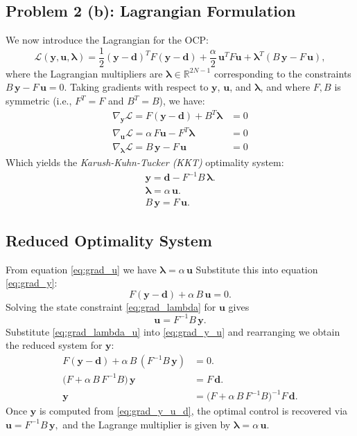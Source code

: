 \documentclass[a4paper,10pt]{article}
\begin{document}
\subsection*{Problem 2 (b): Lagrangian Formulation}

We now introduce the Lagrangian for the OCP:
\[
	\mathcal{L}(\mathbf{y},\mathbf{u},\symbf{\lambda}) = \frac{1}{2}(\mathbf{y}-\mathbf{d})^T F (\mathbf{y}-\mathbf{d}) + \frac{\alpha}{2}\, \mathbf{u}^T F \mathbf{u} + \symbf{\lambda}^T (B\,\mathbf{y} - F\,\mathbf{u}),
\]
where the Lagrangian multipliers are \(\symbf{\lambda} \in \mathbb{R}^{2N-1}\) corresponding to the constraints \(B\,\mathbf{y} - F\,\mathbf{u} = 0\).
Taking gradients with respect to \(\mathbf{y}\), \(\mathbf{u}\), and \(\symbf{\lambda}\), and where \(F, B\) is symmetric (i.e., \(F^T = F\) and \(B^T = B\)), we have:
\begin{align*}
	\nabla_{\mathbf{y}}\mathcal{L} = F(\mathbf{y}-\mathbf{d}) + B^T\symbf{\lambda} & = 0 \\
	\nabla_{\mathbf{u}}\mathcal{L} = \alpha\,F\mathbf{u} - F^T\symbf{\lambda}      & = 0 \\
	\nabla_{\symbf{\lambda}}\mathcal{L} = B\,\mathbf{y} - F\,\mathbf{u}            & = 0
\end{align*}
Which yields the \emph{Karush-Kuhn-Tucker (KKT)} optimality system:
\begin{align*}
	\mathbf{y} = \mathbf{d} - F^{-1}B\,\symbf{\lambda}. \tag{1} \label{eq:grad_y} \\
	\symbf{\lambda} = \alpha\,\mathbf{u}. \tag{2} \label{eq:grad_u}               \\
	B\,\mathbf{y} = F\,\mathbf{u}. \tag{3} \label{eq:grad_lambda}
\end{align*}

\subsection*{Reduced Optimality System}
From equation \eqref{eq:grad_u} we have
\(\symbf{\lambda} = \alpha\,\mathbf{u}\)
Substitute this into equation \eqref{eq:grad_y}:
\[
	F(\mathbf{y}-\mathbf{d}) + \alpha\,B\,\mathbf{u} = 0. \tag{4} \label{eq:grad_y_u}
\]
Solving the state constraint \eqref{eq:grad_lambda} for \(\mathbf{u}\) gives
\[
	\mathbf{u} = F^{-1}B\,\mathbf{y}. \tag{5} \label{eq:grad_lambda_u}
\]
Substitute \eqref{eq:grad_lambda_u} into \eqref{eq:grad_y_u} and rearranging we obtain the reduced system for \(\mathbf{y}\):
\begin{align*}
	F(\mathbf{y}-\mathbf{d}) + \alpha\,B\,(F^{-1}B\,\mathbf{y}) & = 0.                                                                                  \\
	\bigl(F + \alpha\,B\,F^{-1}B\bigr)\,\mathbf{y}              & = F\,\mathbf{d}.                                                                      \\
	\mathbf{y}                                                  & = \bigl(F + \alpha\,B\,F^{-1}B\bigr)^{-1}F\,\mathbf{d}. \tag{6} \label{eq:grad_y_u_d}
\end{align*}
Once \(\mathbf{y}\) is computed from \eqref{eq:grad_y_u_d}, the optimal control is recovered via \(\mathbf{u} = F^{-1}B\,\mathbf{y},\)
and the Lagrange multiplier is given by \(\symbf{\lambda} = \alpha\,\mathbf{u}\).
\end{document}
